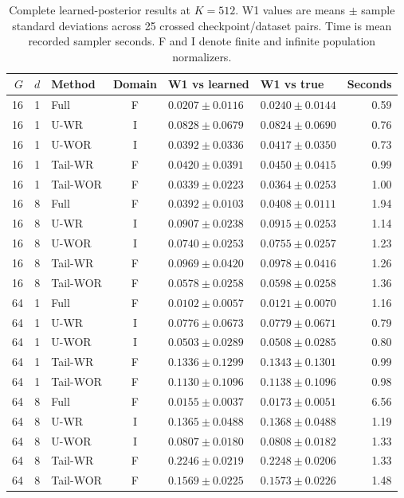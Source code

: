 \begin{table}[htbp]
 \centering
 \caption{Complete learned-posterior results at $K=512$. W1 values are means $\pm$ sample standard deviations across 25 crossed checkpoint/dataset pairs. Time is mean recorded sampler seconds. F and I denote finite and infinite population normalizers.}
 \label{tab:learned-512}
 \small
 \begin{tabular}{rrlcllr}
 \toprule
 $G$ & $d$ & Method & Domain & W1 vs learned & W1 vs true & Seconds\\
 \midrule

16 & 1 & Full & F & $0.0207\pm0.0116$ & $0.0240\pm0.0144$ & 0.59\\
16 & 1 & U-WR & I & $0.0828\pm0.0679$ & $0.0824\pm0.0690$ & 0.76\\
16 & 1 & U-WOR & I & $0.0392\pm0.0336$ & $0.0417\pm0.0350$ & 0.73\\
16 & 1 & Tail-WR & F & $0.0420\pm0.0391$ & $0.0450\pm0.0415$ & 0.99\\
16 & 1 & Tail-WOR & F & $0.0339\pm0.0223$ & $0.0364\pm0.0253$ & 1.00\\
\midrule
16 & 8 & Full & F & $0.0392\pm0.0103$ & $0.0408\pm0.0111$ & 1.94\\
16 & 8 & U-WR & I & $0.0907\pm0.0238$ & $0.0915\pm0.0253$ & 1.14\\
16 & 8 & U-WOR & I & $0.0740\pm0.0253$ & $0.0755\pm0.0257$ & 1.23\\
16 & 8 & Tail-WR & F & $0.0969\pm0.0420$ & $0.0978\pm0.0416$ & 1.26\\
16 & 8 & Tail-WOR & F & $0.0578\pm0.0258$ & $0.0598\pm0.0258$ & 1.36\\
\midrule
64 & 1 & Full & F & $0.0102\pm0.0057$ & $0.0121\pm0.0070$ & 1.16\\
64 & 1 & U-WR & I & $0.0776\pm0.0673$ & $0.0779\pm0.0671$ & 0.79\\
64 & 1 & U-WOR & I & $0.0503\pm0.0289$ & $0.0508\pm0.0285$ & 0.80\\
64 & 1 & Tail-WR & F & $0.1336\pm0.1299$ & $0.1343\pm0.1301$ & 0.99\\
64 & 1 & Tail-WOR & F & $0.1130\pm0.1096$ & $0.1138\pm0.1096$ & 0.98\\
\midrule
64 & 8 & Full & F & $0.0155\pm0.0037$ & $0.0173\pm0.0051$ & 6.56\\
64 & 8 & U-WR & I & $0.1365\pm0.0488$ & $0.1368\pm0.0488$ & 1.19\\
64 & 8 & U-WOR & I & $0.0807\pm0.0180$ & $0.0808\pm0.0182$ & 1.33\\
64 & 8 & Tail-WR & F & $0.2246\pm0.0219$ & $0.2248\pm0.0206$ & 1.33\\
64 & 8 & Tail-WOR & F & $0.1569\pm0.0225$ & $0.1573\pm0.0226$ & 1.48\\
\bottomrule
\end{tabular}
\end{table}

